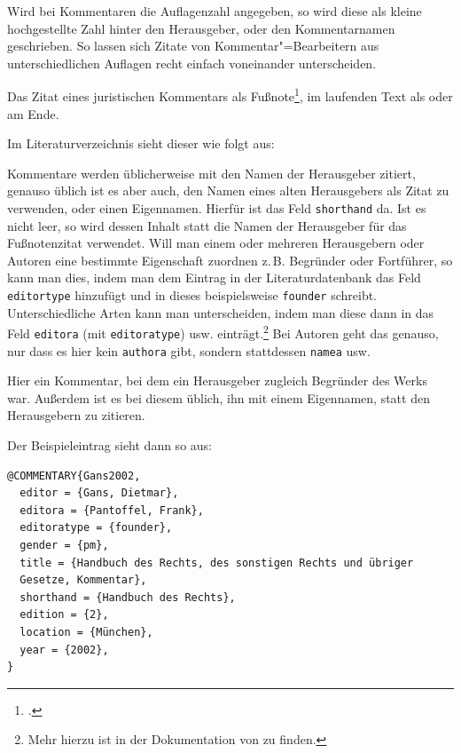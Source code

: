 Wird bei Kommentaren die Auflagenzahl angegeben, so wird diese als kleine hochgestellte Zahl 
hinter den Herausgeber, oder den Kommentarnamen geschrieben. So lassen sich Zitate von 
Kommentar"=Bearbeitern aus unterschiedlichen Auflagen recht einfach voneinander unterscheiden.

Das Zitat eines juristischen Kommentars als Fußnote\footcite[Donald][§~4 Rn.~443]{Duck2009},
im laufenden Text als \cite[Donald][§~4 Rn.~443]{Duck2009} oder am Ende.~\parencite[Donald][§~4 Rn.~443]{Duck2009}


Im Literaturverzeichnis sieht dieser wie folgt aus:

{}

Kommentare werden üblicherweise mit den Namen der Herausgeber zitiert, genauso üblich ist es 
aber auch, den Namen eines alten Herausgebers als Zitat zu verwenden, oder einen Eigennamen. 
Hierfür ist das Feld \texttt{shorthand} da. Ist es nicht leer, so wird dessen Inhalt statt die Namen der 
Herausgeber für das Fußnotenzitat verwendet. Will man einem oder mehreren Herausgebern oder 
Autoren eine bestimmte Eigenschaft zuordnen z.\,B. Begründer oder Fortführer, so kann man dies, 
indem man dem Eintrag in der Literaturdatenbank das Feld \texttt{editortype} hinzufügt und in 
dieses 
beispielsweise \texttt{founder} schreibt. Unterschiedliche Arten kann man unterscheiden, indem man 
diese 
dann in das Feld \texttt{editora} (mit \texttt{editoratype}) usw. einträgt.\footnote{Mehr hierzu ist in 
der 
Dokumentation von \bib zu finden.} Bei Autoren geht das genauso, nur dass es hier kein 
\texttt{authora} gibt, 
sondern stattdessen \texttt{namea} usw.

Hier ein Kommentar, bei dem ein Herausgeber zugleich Begründer des Werks war. Außerdem ist es bei 
diesem üblich, ihn mit einem Eigennamen, statt den Herausgebern zu zitieren.

Der Beispieleintrag sieht dann so aus:

\begin{lstlisting}
@COMMENTARY{Gans2002,
  editor = {Gans, Dietmar},
  editora = {Pantoffel, Frank},
  editoratype = {founder},
  gender = {pm},
  title = {Handbuch des Rechts, des sonstigen Rechts und übriger
  Gesetze, Kommentar},
  shorthand = {Handbuch des Rechts},
  edition = {2},
  location = {München},
  year = {2002},
}
\end{lstlisting}

